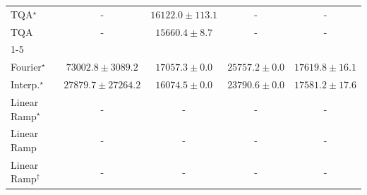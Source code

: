 \begin{tabular}{l|cccc|}
TQA$^\star$ & {\cellcolor[HTML]{000000}} \color[HTML]{F1F1F1} {\cellcolor{white}} \color{black} - & {\cellcolor[HTML]{FFFDDC}} \color[HTML]{000000} $16122.0\pm 113.1$ & {\cellcolor[HTML]{000000}} \color[HTML]{F1F1F1} {\cellcolor{white}} \color{black} - & {\cellcolor[HTML]{000000}} \color[HTML]{F1F1F1} {\cellcolor{white}} \color{black} - \\
TQA & {\cellcolor[HTML]{000000}} \color[HTML]{F1F1F1} {\cellcolor{white}} \color{black} - & {\cellcolor[HTML]{FFFEDF}} \color[HTML]{000000} $15660.4\pm 8.7$ & {\cellcolor[HTML]{000000}} \color[HTML]{F1F1F1} {\cellcolor{white}} \color{black} - & {\cellcolor[HTML]{000000}} \color[HTML]{F1F1F1} {\cellcolor{white}} \color{black} - \\
\cline{1-5}
\multicolumn{5}{c}{\rule{0pt}{8pt}PP} \\
\midrule
Fourier$^\star$ & {\cellcolor[HTML]{004529}} \color[HTML]{F1F1F1} $73002.8\pm 3089.2$ & {\cellcolor[HTML]{FCFED6}} \color[HTML]{000000} $17057.3\pm 0.0$ & {\cellcolor[HTML]{E7F6AD}} \color[HTML]{000000} $25757.2\pm 0.0$ & {\cellcolor[HTML]{FBFED2}} \color[HTML]{000000} $17619.8\pm 16.1$ \\
Interp.$^\star$ & {\cellcolor[HTML]{DEF2A7}} \color[HTML]{000000} $27879.7\pm 27264.2$ & {\cellcolor[HTML]{FDFEDB}} \color[HTML]{000000} $16074.5\pm 0.0$ & {\cellcolor[HTML]{EEF9B3}} \color[HTML]{000000} $23790.6\pm 0.0$ & {\cellcolor[HTML]{FCFED3}} \color[HTML]{000000} $17581.2\pm 17.6$ \\
Linear Ramp$^\star$ & {\cellcolor[HTML]{000000}} \color[HTML]{F1F1F1} {\cellcolor{white}} \color{black} - & {\cellcolor[HTML]{000000}} \color[HTML]{F1F1F1} {\cellcolor{white}} \color{black} - & {\cellcolor[HTML]{000000}} \color[HTML]{F1F1F1} {\cellcolor{white}} \color{black} - & {\cellcolor[HTML]{000000}} \color[HTML]{F1F1F1} {\cellcolor{white}} \color{black} - \\
Linear Ramp & {\cellcolor[HTML]{000000}} \color[HTML]{F1F1F1} {\cellcolor{white}} \color{black} - & {\cellcolor[HTML]{000000}} \color[HTML]{F1F1F1} {\cellcolor{white}} \color{black} - & {\cellcolor[HTML]{000000}} \color[HTML]{F1F1F1} {\cellcolor{white}} \color{black} - & {\cellcolor[HTML]{000000}} \color[HTML]{F1F1F1} {\cellcolor{white}} \color{black} - \\
Linear Ramp$^\dagger$ & {\cellcolor[HTML]{000000}} \color[HTML]{F1F1F1} {\cellcolor{white}} \color{black} - & {\cellcolor[HTML]{000000}} \color[HTML]{F1F1F1} {\cellcolor{white}} \color{black} - & {\cellcolor[HTML]{000000}} \color[HTML]{F1F1F1} {\cellcolor{white}} \color{black} - & {\cellcolor[HTML]{000000}} \color[HTML]{F1F1F1} {\cellcolor{white}} \color{black} - \\

\end{tabular}
